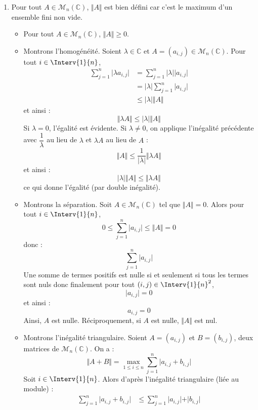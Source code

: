 \documentclass[a4paper,10pt]{report}
\begin{document}
\begin{enumerate}
\item Pour tout $A \in \mathcal{M}_n(\mathbb{C})$, $\Vert A \Vert$ est bien défini car c'est le maximum d'un ensemble fini non vide.

\begin{itemize}
\item Pour tout $A \in \mathcal{M}_n(\mathbb{C})$, $\Vert A \Vert \geq 0$.
\item Montrons l'homogénéité. Soient $\lambda \in \mathbb{C}$ et $A=(a_{i,j}) \in \mathcal{M}_n(\mathbb{C})$. Pour tout $i \in \Interv{1}{n}$,
\begin{align*}
 \sum_{j=1}^n \vert \lambda a_{i,j} \vert & =  \sum_{j=1}^n \vert \lambda \vert \vert a_{i,j} \vert \\
 & =  \vert \lambda \vert \sum_{j=1}^n \vert a_{i,j} \vert \\
 & \leq \vert \lambda \vert \Vert A \Vert
 \end{align*}
 et ainsi :
 $$ \Vert \lambda A \Vert \leq \vert \lambda \vert \Vert A \Vert$$
 Si $\lambda=0$, l'égalité est évidente. Si $\lambda \neq 0$, on applique l'inégalité précédente avec $\dfrac{1}{\lambda}$ au lieu de $\lambda$ et $\lambda A$ au lieu de $A$ :
 $$ \Vert A \Vert \leq \dfrac{1}{\vert \lambda \vert} \Vert \lambda A \Vert$$
 et ainsi :
 $$  \vert \lambda \vert \Vert A \Vert \leq \Vert \lambda A \Vert$$
 ce qui donne l'égalité (par double inégalité).
 \item Montrons la séparation. Soit $A \in \mathcal{M}_n(\mathbb{C})$ tel que $\Vert A \Vert =0$. Alors pour tout $i \in \Interv{1}{n}$,
$$ 0 \leq \sum_{j=1}^n \vert a_{i,j} \vert \leq \Vert A \Vert = 0$$
donc :
$$ \sum_{j=1}^n \vert a_{i,j} \vert$$
Une somme de termes positifs est nulle si et seulement si tous les termes sont nuls donc finalement pour tout $(i,j) \in \Interv{1}{n}^2$,
$$  \vert a_{i,j} \vert = 0$$
et ainsi :
$$ a_{i,j}=0$$
Ainsi, $A$ est nulle. Réciproquement, si $A$ est nulle, $\Vert A \Vert$ est nul.
\item Montrons l'inégalité triangulaire. Soient $A=(a_{i,j})$ et $B=(b_{i,j})$, deux matrices de $\mathcal{M}_n(\mathbb{C})$. On a :
$$ \Vert A+B \Vert = \max_{1 \leq i \leq n} \sum_{j=1}^n \vert a_{i,j}+ b_{i,j} \vert$$
Soit $i \in \Interv{1}{n}$. Alors d'après l'inégalité triangulaire (liée au module) :
\begin{align*}
 \sum_{j=1}^n \vert a_{i,j}+ b_{i,j} \vert &  \leq \sum_{j=1}^n \vert a_{i,j} \vert + \vert b_{i,j} \vert \\

\end{align*}
\end{itemize}
\end{enumerate}
\end{document}
